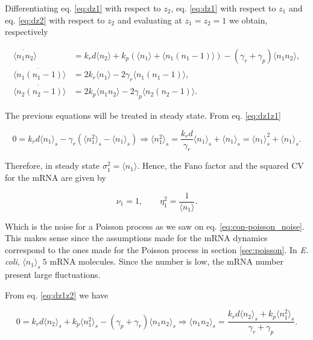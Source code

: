 Differentiating eq. \eqref{eq:dz1} with respect to $z_2$, eq. \eqref{eq:dz1} with respect to $z_1$ and eq. \eqref{eq:dz2} with respect to $z_2$ and evaluating at $z_1 = z_2 = 1$ we obtain, respectively

\begin{align}
  \dot{\langle n_1n_2\rangle} &= k_rd\langle n_2 \rangle + k_p\left(\langle n_1\rangle + \langle n_1(n_1-1) \rangle \right) - \left( \gamma_r + \gamma_p \right)\langle n_1n_2 \rangle,\label{eq:dz1z2}\\
  \dot{\langle n_1(n_1-1)\rangle} &= 2k_r\langle n_1\rangle-2\gamma_r\langle n_1(n_1-1) \rangle, \label{eq:dz1z1}\\
  \dot{\langle n_2(n_2-1)\rangle} &= 2k_p\langle n_1n_2 \rangle - 2\gamma_p\langle n_2(n_2-1)\rangle. \label{eq:dz2z2}
\end{align}

The previous equations will be treated in steady state. From  eq. \eqref{eq:dz1z1}

\begin{equation}
  \label{eq:pren1}
  0 = k_rd \langle n_1 \rangle_s -\gamma_r \left(\langle n_1^2 \rangle_s - \langle n_1 \rangle_s \right) \Rightarrow \langle n_1^2 \rangle_s = \frac{k_rd}{\gamma_r}\langle n_1 \rangle_s + \langle n_1 \rangle_s = \langle n_1 \rangle_s^2 + \langle n_1 \rangle_s.
\end{equation}

Therefore, in steady state $\sigma_1^2 = \langle n_1 \rangle$. Hence, the Fano factor and the squared CV for the mRNA are given by

\begin{equation}
  \label{noise1}
  \nu_1 = 1, \quad\quad \eta_1^2 = \frac{1}{\langle n_1 \rangle}.
\end{equation}

Which is the noise for a Poisson process as we saw on eq. \eqref{eq:con-poisson_noise}. This makes sense since the assumptions made for the mRNA dynamics correspond to the ones made for the Poisson process in section \ref{sec:poisson}. In \textit{E. coli}, $\langle n_1\rangle_s ~ 5$ mRNA molecules. Since the number is low, the mRNA number present large fluctuations.

From eq. \eqref{eq:dz1z2} we have

\begin{equation*}
  0 = k_rd \langle n_2 \rangle_s + k_p \langle n_1^2 \rangle_s - (\gamma_p + \gamma_r) \langle n_1n_2 \rangle_s \Rightarrow \langle n_1n_2 \rangle_s  = \frac{k_rd\langle n_2\rangle_s+k_p\langle n_1^2\rangle_s}{\gamma_r+\gamma_p}.
\end{equation*}

